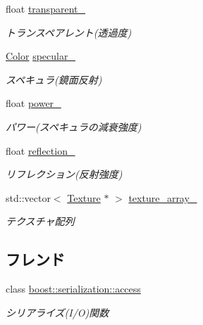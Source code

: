 \begin{DoxyCompactItemize}
float \mbox{\hyperlink{class_md_bin_data_1_1_material_a1d6d026a2e515d99c43bce457a99fb58}{transparent\+\_\+}}
\begin{DoxyCompactList}\small\item\em トランスペアレント(透過度) \end{DoxyCompactList}\item 
\mbox{\hyperlink{class_md_bin_data_1_1_color}{Color}} \mbox{\hyperlink{class_md_bin_data_1_1_material_a00c16d1b0970a1bfac1cbf5ae02511d4}{specular\+\_\+}}
\begin{DoxyCompactList}\small\item\em スペキュラ(鏡面反射) \end{DoxyCompactList}\item 
float \mbox{\hyperlink{class_md_bin_data_1_1_material_a5b8feee785a823f459b61c49da74441a}{power\+\_\+}}
\begin{DoxyCompactList}\small\item\em パワー(スペキュラの減衰強度) \end{DoxyCompactList}\item 
float \mbox{\hyperlink{class_md_bin_data_1_1_material_ac33b9c6e70a1eb229007e6c4f9c94712}{reflection\+\_\+}}
\begin{DoxyCompactList}\small\item\em リフレクション(反射強度) \end{DoxyCompactList}\item 
std\+::vector$<$ \mbox{\hyperlink{class_md_bin_data_1_1_material_1_1_texture}{Texture}} $\ast$ $>$ \mbox{\hyperlink{class_md_bin_data_1_1_material_ad5872731e44ecb8de180ccafa689bc6a}{texture\+\_\+array\+\_\+}}
\begin{DoxyCompactList}\small\item\em テクスチャ配列 \end{DoxyCompactList}\end{DoxyCompactItemize}
\subsection*{フレンド}
\begin{DoxyCompactItemize}
\item 
class \mbox{\hyperlink{class_md_bin_data_1_1_material_ac98d07dd8f7b70e16ccb9a01abf56b9c}{boost\+::serialization\+::access}}
\begin{DoxyCompactList}\small\item\em シリアライズ(I/O)関数 \end{DoxyCompactList}\end{DoxyCompactItemize}


